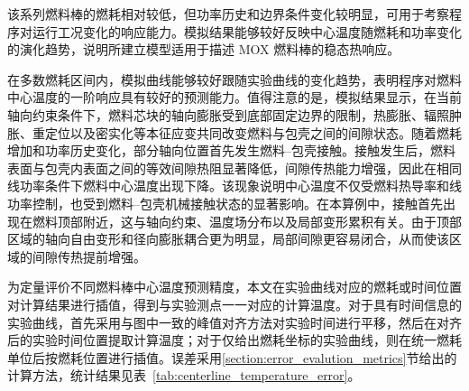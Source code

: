 \FloatBarrier

该系列燃料棒的燃耗相对较低，但功率历史和边界条件变化较明显，可用于考察程序对运行工况变化的响应能力。模拟结果能够较好反映中心温度随燃耗和功率变化的演化趋势，说明所建立模型适用于描述 MOX 燃料棒的稳态热响应。

在多数燃耗区间内，模拟曲线能够较好跟随实验曲线的变化趋势，表明程序对燃料中心温度的一阶响应具有较好的预测能力。值得注意的是，模拟结果显示，在当前轴向约束条件下，燃料芯块的轴向膨胀受到底部固定边界的限制，热膨胀、辐照肿胀、重定位以及密实化等本征应变共同改变燃料与包壳之间的间隙状态。随着燃耗增加和功率历史变化，部分轴向位置首先发生燃料--包壳接触。接触发生后，燃料表面与包壳内表面之间的等效间隙热阻显著降低，间隙传热能力增强，因此在相同线功率条件下燃料中心温度出现下降。该现象说明中心温度不仅受燃料热导率和线功率控制，也受到燃料--包壳机械接触状态的显著影响。在本算例中，接触首先出现在燃料顶部附近，这与轴向约束、温度场分布以及局部变形累积有关。由于顶部区域的轴向自由变形和径向膨胀耦合更为明显，局部间隙更容易闭合，从而使该区域的间隙传热提前增强。

为定量评价不同燃料棒中心温度预测精度，本文在实验曲线对应的燃耗或时间位置对计算结果进行插值，得到与实验测点一一对应的计算温度。对于具有时间信息的实验曲线，首先采用与图中一致的峰值对齐方法对实验时间进行平移，然后在对齐后的实验时间位置提取计算温度；对于仅给出燃耗坐标的实验曲线，则在统一燃耗单位后按燃耗位置进行插值。误差采用\ref{section:error_evalution_metrics}节给出的计算方法，统计结果见表~\ref{tab:centerline_temperature_error}。

